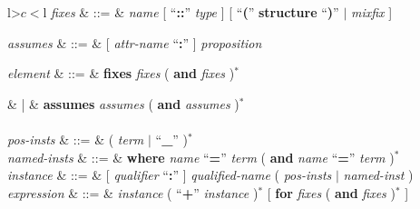 \begin{isabellebody}
\begin{isamarkuptext}
\begin{table}
\begin{center}
\begin{tabular}{l>$c<$l}
  \textit{fixes} & ::=
  & \textit{name} [ ``\textbf{::}'' \textit{type} ]
    [ ``\textbf{(}'' \textbf{structure} ``\textbf{)}'' $|$
    \textit{mixfix} ] \\
\begin{comment}
  \textit{constrains} & ::=
  & \textit{name} ``\textbf{::}'' \textit{type} \\
\end{comment}
  \textit{assumes} & ::=
  & [ \textit{attr-name} ``\textbf{:}'' ] \textit{proposition} \\
\begin{comment}
  \textit{defines} & ::=
  & [ \textit{attr-name} ``\textbf{:}'' ] \textit{proposition} \\
  \textit{notes} & ::=
  & [ \textit{attr-name} ``\textbf{=}'' ]
    ( \textit{qualified-name} [ \textit{attribute} ] )$^+$ \\
\end{comment}

  \textit{element} & ::=
  & \textbf{fixes} \textit{fixes} ( \textbf{and} \textit{fixes} )$^*$ \\
\begin{comment}
  & |
  & \textbf{constrains} \textit{constrains}
    ( \textbf{and} \textit{constrains} )$^*$ \\
\end{comment}
  & |
  & \textbf{assumes} \textit{assumes} ( \textbf{and} \textit{assumes} )$^*$ \\[2ex]

   \\

  \textit{pos-insts} & ::=
  & ( \textit{term} $|$ ``\textbf{\_}'' )$^*$ \\
  \textit{named-insts} & ::=
  & \textbf{where} \textit{name} ``\textbf{=}'' \textit{term}
  ( \textbf{and} \textit{name} ``\textbf{=}'' \textit{term} )$^*$ \\
  \textit{instance} & ::=
  & [ \textit{qualifier} ``\textbf{:}'' ]
    \textit{qualified-name} ( \textit{pos-insts} $|$ \textit{named-inst} ) \\
  \textit{expression}  & ::= 
  & \textit{instance} ( ``\textbf{+}'' \textit{instance} )$^*$
    [ \textbf{for} \textit{fixes} ( \textbf{and} \textit{fixes} )$^*$ ] \\[2ex]


\end{tabular}
\end{center}
\end{table}
\end{isamarkuptext}
\end{isabellebody}
